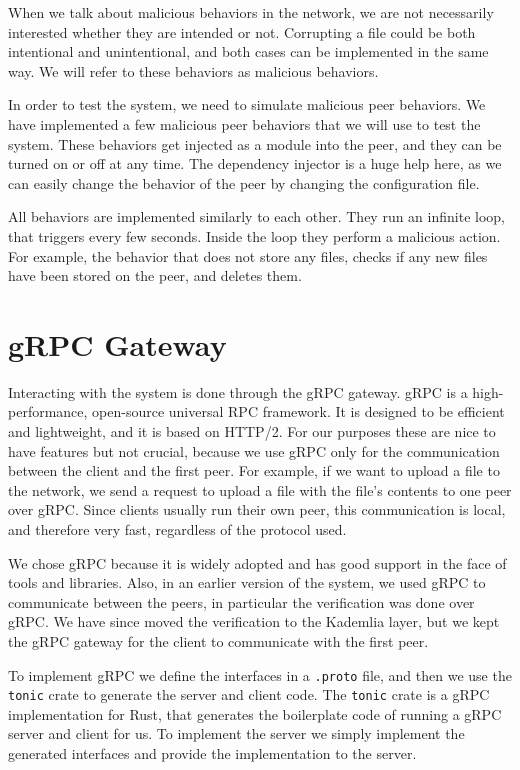 When we talk about malicious behaviors in the network,
we are not necessarily interested whether they are intended or not.
Corrupting a file could be both intentional and unintentional,
and both cases can be implemented in the same way.
We will refer to these behaviors as malicious behaviors.

In order to test the system, we need to simulate malicious peer behaviors.
We have implemented a few malicious peer behaviors that we will use to test the system.
These behaviors get injected as a module into the peer,
and they can be turned on or off at any time.
The dependency injector is a huge help here, as we can easily change the behavior of the peer
by changing the configuration file.

All behaviors are implemented similarly to each other.
They run an infinite loop, that triggers every few seconds.
Inside the loop they perform a malicious action.
For example, the behavior that does not store any files,
checks if any new files have been stored on the peer, and deletes them.

\section{gRPC Gateway}

Interacting with the system is done through the gRPC gateway.
gRPC is a high-performance, open-source universal RPC framework.
It is designed to be efficient and lightweight, and it is based on HTTP/2.
For our purposes these are nice to have features but not crucial,
because we use gRPC only for the communication between the client and the first peer.
For example, if we want to upload a file to the network,
we send a request to upload a file with the file's contents to one peer over gRPC.
Since clients usually run their own peer, this communication is local,
and therefore very fast, regardless of the protocol used.

We chose gRPC because it is widely adopted and has good support in the face of
tools and libraries.
Also, in an earlier version of the system, we used gRPC to communicate between the peers,
in particular the verification was done over gRPC.
We have since moved the verification to the Kademlia layer,
but we kept the gRPC gateway for the client to communicate with the first peer.

To implement gRPC we define the interfaces in a \texttt{.proto} file,
and then we use the \texttt{tonic} crate to generate the server and client code.
The \texttt{tonic} crate is a gRPC implementation for Rust,
that generates the boilerplate code of running a gRPC server and client for us.
To implement the server we simply implement the generated interfaces
and provide the implementation to the server.

